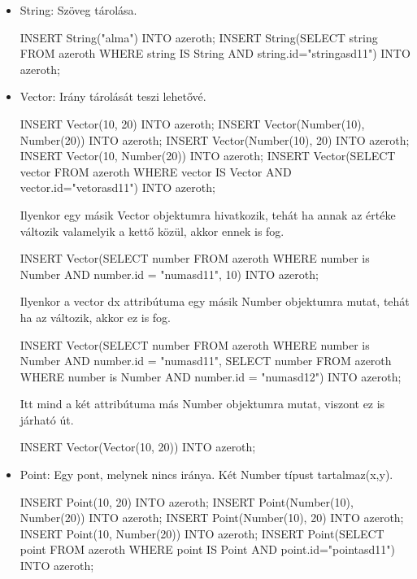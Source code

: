 \begin{itemize}
\item String: Szöveg tárolása.

\begin{sql}
INSERT String("alma") INTO azeroth;
INSERT String(SELECT string FROM azeroth WHERE string IS String AND string.id="stringasd11") INTO azeroth;
\end{sql}


\item Vector: Irány tárolását teszi lehetővé.

\begin{sql}
INSERT Vector(10, 20) INTO azeroth;
INSERT Vector(Number(10), Number(20)) INTO azeroth;
INSERT Vector(Number(10), 20) INTO azeroth;
INSERT Vector(10, Number(20)) INTO azeroth;
INSERT Vector(SELECT vector FROM azeroth WHERE vector IS Vector AND vector.id="vetorasd11") INTO azeroth;
\end{sql}

Ilyenkor egy másik Vector objektumra hivatkozik, tehát ha annak az értéke változik valamelyik a kettő közül, akkor ennek is fog.

\begin{sql}
INSERT Vector(SELECT number FROM azeroth WHERE number is Number AND number.id = "numasd11", 10) INTO azeroth;
\end{sql}

Ilyenkor a vector dx attribútuma egy másik Number objektumra mutat, tehát ha az változik, akkor ez is fog.

\begin{sql}
INSERT Vector(SELECT number FROM azeroth WHERE number is Number AND number.id = "numasd11", SELECT number FROM azeroth WHERE number is Number AND number.id = "numasd12") INTO azeroth;
\end{sql}

Itt mind a két attribútuma más Number objektumra mutat, viszont ez is járható út.

\begin{sql}
INSERT Vector(Vector(10, 20)) INTO azeroth;
\end{sql}

\item Point: Egy pont, melynek nincs iránya. Két Number típust tartalmaz(x,y).

\begin{sql}
INSERT Point(10, 20) INTO azeroth;
INSERT Point(Number(10), Number(20)) INTO azeroth;
INSERT Point(Number(10), 20) INTO azeroth;
INSERT Point(10, Number(20)) INTO azeroth;
INSERT Point(SELECT point FROM azeroth WHERE point IS Point AND point.id="pointasd11") INTO azeroth;
\end{sql}


\end{itemize}
